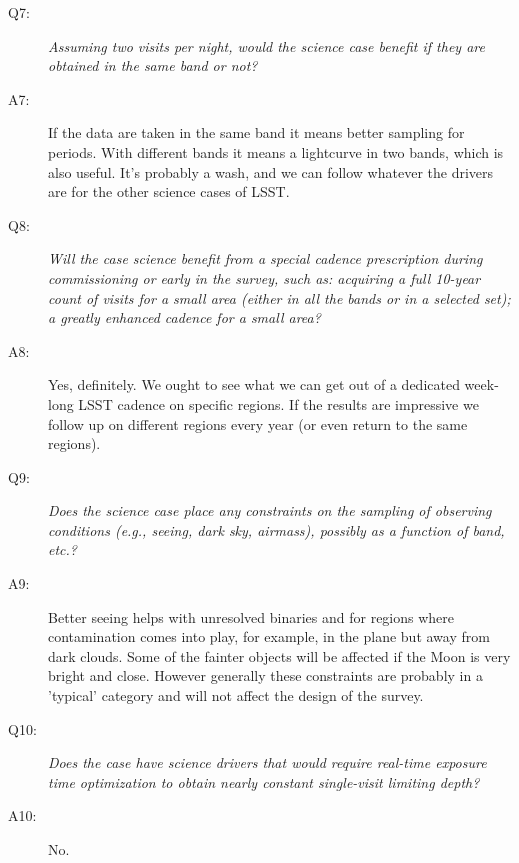 \begin{description}
\item[Q7:] {\it Assuming two visits per night, would the science case
benefit if they are obtained in the same band or not?}

\item[A7:] 
If the data are taken in the same band
it means better sampling for periods. With different bands it means a lightcurve in two bands,
which is also useful. It's probably a wash, and we can follow whatever the drivers are for the
other science cases of LSST.

\item[Q8:] {\it Will the case science benefit from a special cadence
prescription during commissioning or early in the survey, such as:
acquiring a full 10-year count of visits for a small area (either in all
the bands or in a  selected set); a greatly enhanced cadence for a small
area?}

\item[A8:] 
Yes, definitely. We ought to see what we can get out of a dedicated week-long
LSST cadence on specific regions. If the results are impressive we follow up 
on different regions every year (or even return to the same regions).

\item[Q9:] {\it Does the science case place any constraints on the
sampling of observing conditions (e.g., seeing, dark sky, airmass),
possibly as a function of band, etc.?}

\item[A9:] 

Better seeing helps with unresolved binaries and for regions where contamination comes
into play, for example, in the plane but away from dark clouds. Some of the fainter objects
will be affected if the Moon is very bright and close. However generally these constraints
are probably in a 'typical' category and will not affect the design of the survey.

\item[Q10:] {\it Does the case have science drivers that would require
real-time exposure time optimization to obtain nearly constant
single-visit limiting depth?}

\item[A10:] 
No.

\end{description}



